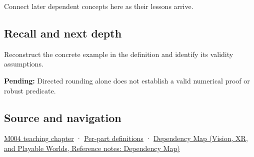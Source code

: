 \hypertarget{appendix-1823a14330cb-used-by}{}

Connect later dependent concepts here as their lessons arrive.

\subsection{Recall and next depth}\label{appendix-1823a14330cb-recall-and-next-depth}

\hypertarget{appendix-1823a14330cb-recall-and-next-depth}{}

Reconstruct the concrete example in the definition and identify its validity assumptions.

\textbf{Pending:} Directed rounding alone does not establish a valid numerical proof or robust predicate.

\subsection{Source and navigation}\label{appendix-1823a14330cb-source-and-navigation}

\hypertarget{appendix-1823a14330cb-source-and-navigation}{}

\hyperref[01-foundations-i-ch001-a-stretching-ruler-for-real-valued-quantities]{M004 teaching chapter} · \hyperref[appendix-fd090d982a15-m004---parts-61-76]{Per-part definitions} · \href{../07-Vision-XR-and-Playable-Worlds/main.pdf\#nameddest=appendix-4ad47bdd269a}{Dependency Map (Vision, XR, and Playable Worlds, Reference notes: Dependency Map)}

